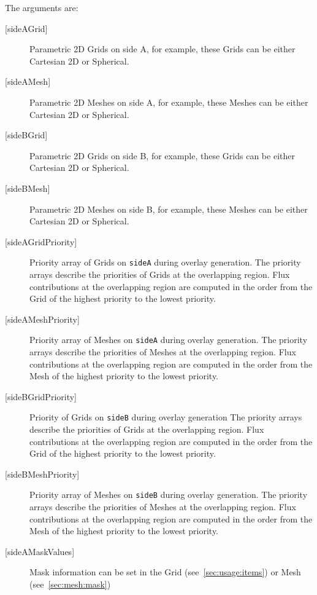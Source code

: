   
       The arguments are:
       \begin{description}
       \item [{[sideAGrid]}]
             Parametric 2D Grids on side A, for example, 
             these Grids can be either Cartesian 2D or Spherical.
       \item [{[sideAMesh]}]
             Parametric 2D Meshes on side A, for example, 
             these Meshes can be either Cartesian 2D or Spherical.
       \item [{[sideBGrid]}]
             Parametric 2D Grids on side B, for example, 
             these Grids can be either Cartesian 2D or Spherical.
       \item [{[sideBMesh]}]
             Parametric 2D Meshes on side B, for example, 
             these Meshes can be either Cartesian 2D or Spherical.
       \item [{[sideAGridPriority]}]
             Priority array of Grids on {\tt sideA} during overlay generation.
             The priority arrays describe the priorities of Grids at the overlapping region.
             Flux contributions at the overlapping region are computed in the order from the Grid of the
             highest priority to the lowest priority.
       \item [{[sideAMeshPriority]}]
             Priority array of Meshes on {\tt sideA} during overlay generation.
             The priority arrays describe the priorities of Meshes at the overlapping region.
             Flux contributions at the overlapping region are computed in the order from the Mesh of the
             highest priority to the lowest priority.
       \item [{[sideBGridPriority]}]
             Priority of Grids on {\tt sideB} during overlay generation
             The priority arrays describe the priorities of Grids at the overlapping region.
             Flux contributions at the overlapping region are computed in the order from the Grid of the
             highest priority to the lowest priority.
       \item [{[sideBMeshPriority]}]
             Priority array of Meshes on {\tt sideB} during overlay generation.
             The priority arrays describe the priorities of Meshes at the overlapping region.
             Flux contributions at the overlapping region are computed in the order from the Mesh of the
             highest priority to the lowest priority.
       \item [{[sideAMaskValues]}]
             Mask information can be set in the Grid (see~\ref{sec:usage:items}) or Mesh (see~\ref{sec:mesh:mask}) 

\end{description}
